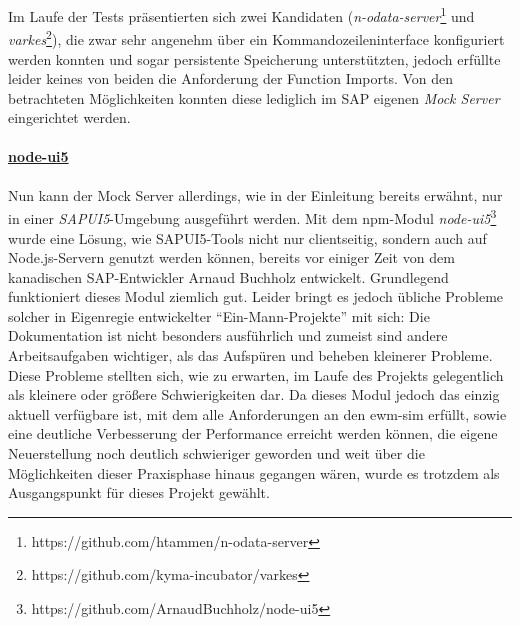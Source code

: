 Im Laufe der Tests präsentierten sich zwei Kandidaten (\emph{n-odata-server}\footnote{https://github.com/htammen/n-odata-server} und \emph{varkes}\footnote{https://github.com/kyma-incubator/varkes}), die zwar sehr angenehm über ein Kommandozeileninterface konfiguriert werden konnten und sogar persistente Speicherung unterstützten, jedoch erfüllte leider keines von beiden die Anforderung der Function Imports.
Von den betrachteten Möglichkeiten konnten diese lediglich im SAP eigenen \emph{Mock Server} eingerichtet werden.

\paragraph{\href{https://github.com/ArnaudBuchholz/node-ui5}{node-ui5}}
Nun kann der Mock Server allerdings, wie in der Einleitung bereits erwähnt, nur in einer \emph{SAPUI5}-Umgebung ausgeführt werden.
Mit dem \ac{npm}-Modul \emph{node-ui5}\footnote{https://github.com/ArnaudBuchholz/node-ui5} wurde eine Lösung, wie SAPUI5-Tools nicht nur clientseitig, sondern auch auf Node.js-Servern genutzt werden können, bereits vor einiger Zeit von dem kanadischen SAP-Entwickler Arnaud Buchholz entwickelt.
Grundlegend funktioniert dieses Modul ziemlich gut.
Leider bringt es jedoch übliche Probleme solcher in Eigenregie entwickelter \enquote{Ein-Mann-Projekte} mit sich: Die Dokumentation ist nicht besonders ausführlich und zumeist sind andere Arbeitsaufgaben wichtiger, als das Aufspüren und beheben kleinerer Probleme.
Diese Probleme stellten sich, wie zu erwarten, im Laufe des Projekts gelegentlich als kleinere oder größere Schwierigkeiten dar.
Da dieses Modul jedoch das einzig aktuell verfügbare ist, mit dem alle Anforderungen an den \ac{ewm-sim} erfüllt, sowie eine deutliche Verbesserung der Performance erreicht werden können, die eigene Neuerstellung noch deutlich schwieriger geworden und weit über die Möglichkeiten dieser Praxisphase hinaus gegangen wären, wurde es trotzdem als Ausgangspunkt für dieses Projekt gewählt.~\cite{node-ui5-npm, node-ui5-github}